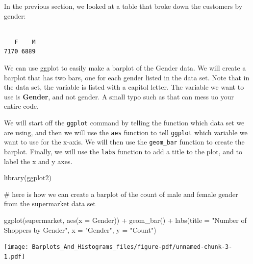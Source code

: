 \documentclass[
  letterpaper,
  DIV=11,
  numbers=noendperiod]{scrreprt}
\newenvironment{Shaded}{\begin{snugshade}}{\end{snugshade}}
\newcommand{\AttributeTok}[1]{\textcolor[rgb]{0.40,0.45,0.13}{#1}}
\newcommand{\CommentTok}[1]{\textcolor[rgb]{0.37,0.37,0.37}{#1}}
\newcommand{\FunctionTok}[1]{\textcolor[rgb]{0.28,0.35,0.67}{#1}}
\newcommand{\NormalTok}[1]{\textcolor[rgb]{0.00,0.23,0.31}{#1}}
\newcommand{\OtherTok}[1]{\textcolor[rgb]{0.00,0.23,0.31}{#1}}
\newcommand{\SpecialCharTok}[1]{\textcolor[rgb]{0.37,0.37,0.37}{#1}}
\newcommand{\StringTok}[1]{\textcolor[rgb]{0.13,0.47,0.30}{#1}}
\begin{document}
In the previous section, we looked at a table that broke down the
customers by gender:

\begin{Shaded}
\end{Shaded}

\begin{verbatim}

   F    M 
7170 6889 
\end{verbatim}

We can use ggplot to easily make a barplot of the Gender data. We will
create a barplot that has two bars, one for each gender listed in the
data set. Note that in the data set, the variable is listed with a
capitol letter. The variable we want to use is \textbf{Gender}, and not
gender. A small typo such as that can mess uo your entire code.

We will start off the \texttt{ggplot} command by telling the function
which data set we are using, and then we will use the \texttt{aes}
function to tell \texttt{ggplot} which variable we want to use for the
x-axis. We will then use the \texttt{geom\_bar} function to create the
barplot. Finally, we will use the \texttt{labs} function to add a title
to the plot, and to label the x and y axes.

\begin{Shaded}
\begin{Highlighting}[]
\FunctionTok{library}\NormalTok{(ggplot2)}

\CommentTok{\# here is how we can create a barplot of the count of  male and female gender from the supermarket data set}

\FunctionTok{ggplot}\NormalTok{(supermarket, }\FunctionTok{aes}\NormalTok{(}\AttributeTok{x =}\NormalTok{ Gender)) }\SpecialCharTok{+}
  \FunctionTok{geom\_bar}\NormalTok{() }\SpecialCharTok{+}
  \FunctionTok{labs}\NormalTok{(}\AttributeTok{title =} \StringTok{"Number of Shoppers by Gender"}\NormalTok{,}
       \AttributeTok{x =} \StringTok{"Gender"}\NormalTok{,}
       \AttributeTok{y =} \StringTok{"Count"}\NormalTok{)}
\end{Highlighting}
\end{Shaded}

\texttt{[image: Barplots\_And\_Histograms\_files/figure-pdf/unnamed-chunk-3-1.pdf]}
\end{document}
